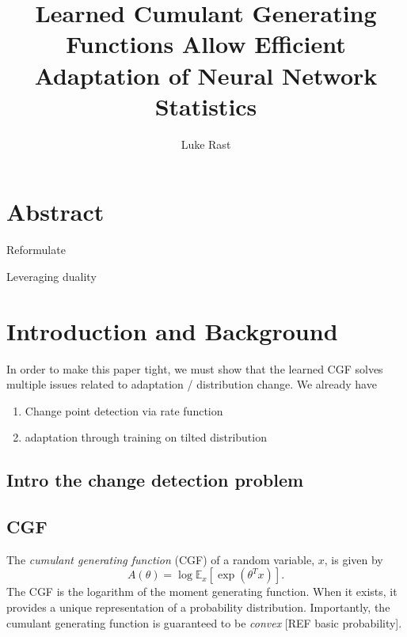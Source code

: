 \documentclass[10pt]{article}      %
\begin{document}
\title{Learned Cumulant Generating Functions Allow Efficient Adaptation of Neural Network Statistics}
\author{Luke Rast}
\maketitle

\doublespacing
\linenumbers


\section{Abstract}

Reformulate




Leveraging duality 




\section{Introduction and Background}



In order to make this paper tight, we must show that the learned CGF solves multiple issues related to adaptation / distribution change.
We already have
\begin{enumerate}
  \item Change point detection via rate function
  \item adaptation through training on tilted distribution
\end{enumerate}


\subsection{Intro the change detection problem}






\subsection{CGF}

The \textit{cumulant generating function} (CGF) of a random variable, $x$, is given by
\begin{equation}
  A(\theta) = \log \mathbb{E}_x[\exp(\theta^T x)]. \label{def:cgf}
\end{equation}
The CGF is the logarithm of the moment generating function.
When it exists, it provides a unique representation of a probability distribution.
Importantly, the cumulant generating function is guaranteed to be \textit{convex} [REF basic probability].
\end{document}
